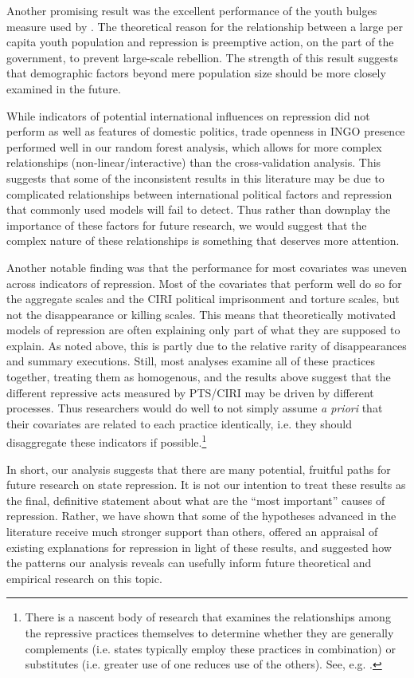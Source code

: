 \documentclass[11pt]{article}
\begin{document}
Another promising result was the excellent performance of the youth bulges measure used by \citet{NordasDavenport2013}. The theoretical reason for the relationship between a large per capita youth population and repression is preemptive action, on the part of the government, to prevent large-scale rebellion. The strength of this result suggests that demographic factors beyond mere population size should be more closely examined in the future. 

While indicators of potential international influences on repression did not perform as well as features of domestic politics, trade openness in INGO presence performed well in our random forest analysis, which allows for more complex relationships (non-linear/interactive) than the cross-validation analysis. This suggests that some of the inconsistent results in this literature may be due to complicated relationships between international political factors and repression that commonly used models will fail to detect. Thus rather than downplay the importance of these factors for future research, we would suggest that the complex nature of these relationships is something that deserves more attention.

Another notable finding was that the performance for most covariates was uneven across indicators of repression. Most of the covariates that perform well do so for the aggregate scales and the CIRI political imprisonment and torture scales, but not the disappearance or killing scales. This means that theoretically motivated models of repression are often explaining only part of what they are supposed to explain. As noted above, this is partly due to the relative rarity of disappearances and summary executions. Still, most analyses examine all of these practices together, treating them as homogenous, and the results above suggest that the different repressive acts measured by PTS/CIRI may be driven by different processes. Thus researchers would do well to not simply assume {\em a priori} that their covariates are related to each practice identically, i.e. they should disaggregate these indicators if possible.\footnote{There is a nascent body of research that examines the relationships among the repressive practices themselves to determine whether they are generally complements (i.e. states typically employ these practices in combination) or substitutes (i.e. greater use of one reduces use of the others). See, e.g. \citet{Belletal2013,Demerittetal2014,FarissSchnakenbergJCR}.} 

In short, our analysis suggests that there are many potential, fruitful paths for future research on state repression. It is not our intention to treat these results as the final, definitive statement about what are the ``most important'' causes of repression. Rather, we have shown that some of the hypotheses advanced in the literature receive much stronger support than others, offered an appraisal of existing explanations for repression in light of these results, and suggested how the patterns our analysis reveals can usefully inform future theoretical and empirical research on this topic.  
\end{document}
